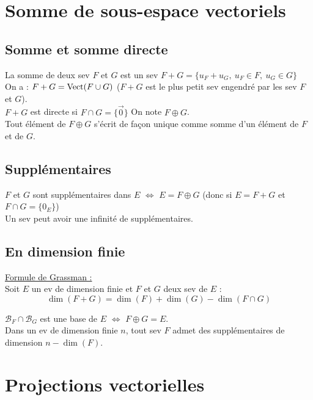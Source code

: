 \section{Somme de sous-espace vectoriels}\label{sec:somme-de-sous-espace-vectoriels}

    \subsection{Somme et somme directe}\label{subsec:somme-et-somme-directe}

        La somme de deux sev $F$ et $G$ est un sev $F + G = \{u_F + u_G,\ u_F \in F,\ u_G \in G\}$\\

        On a : $F + G = \operatorname{Vect}(F \cup G)$ ($F + G$ est le plus petit sev engendré par les sev $F$ et $G$).\\
        $F + G$ est directe si $F \cap G = \{\vec 0 \}$ On note $F \oplus G$.\\
        Tout élément de $F \oplus G$ s'écrit de façon unique comme somme d'un élément de $F$ et de $G$.

    \subsection{Supplémentaires}\label{subsec:supplementaires}
        $F$ et $G$ sont supplémentaires dans $E$ $\iff$ $E = F \oplus G$ (donc si  $E = F + G$ et $F \cap G = \{0_E\}$)\\

        Un sev peut avoir une infinité de supplémentaires.

    \subsection{En dimension finie}\label{subsec:en-dimension-finie}

        \underline{Formule de Grassman :}\\
        Soit $E$ un ev de dimension finie et $F$ et $G$ deux sev de $E$ :
        \[\dim(F + G) = \dim(F) + \dim(G) - \dim(F \cap G)\]

        $\mathcal{B}_F \cap \mathcal{B}_G$ est une base de $E$ $\iff$ $F \oplus G = E$.\\
        Dans un ev de dimension finie $n$, tout sev $F$ admet des supplémentaires de dimension $n - \dim(F)$.


\section{Projections vectorielles}\label{sec:projections-vectorielles}

